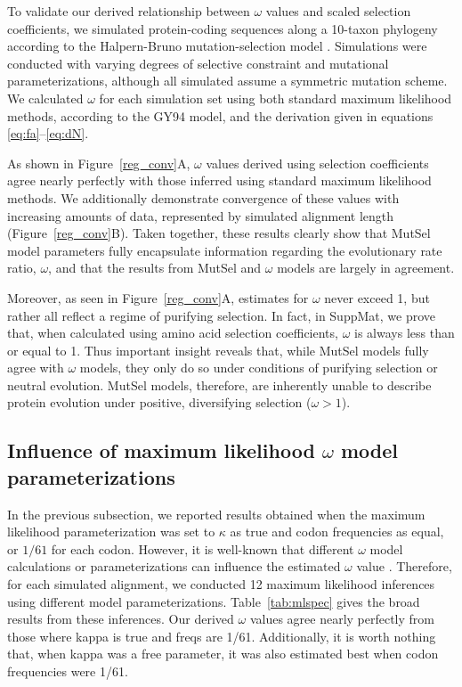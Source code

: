 \documentclass[11pt]{article}
\begin{document}
To validate our derived relationship between $\omega$ values and scaled selection coefficients, we simulated protein-coding sequences along a 10-taxon phylogeny according to the Halpern-Bruno mutation-selection model \cite{HalpernBruno1998}. Simulations were conducted with varying degrees of selective constraint and mutational parameterizations, although all simulated assume a symmetric mutation scheme. We calculated $\omega$ for each simulation set using both standard maximum likelihood methods, according to the GY94 \cite{GoldmanYang1994} model, and the derivation given in equations \eqref{eq:fa}--\eqref{eq:dN}. 

As shown in Figure~\ref{reg_conv}A, $\omega$ values derived using selection coefficients agree nearly perfectly with those inferred using standard maximum likelihood methods. We additionally demonstrate convergence of these values with increasing amounts of data, represented by simulated alignment length (Figure~\ref{reg_conv}B). Taken together, these results clearly show that MutSel model parameters fully encapsulate information regarding the evolutionary rate ratio, $\omega$, and that the results from MutSel and $\omega$ models are largely in agreement. 

Moreover, as seen in Figure~\ref{reg_conv}A, estimates for $\omega$ never exceed 1, but rather all reflect a regime of purifying selection. In fact, in SuppMat, we prove that, when calculated using amino acid selection coefficients, $\omega$ is always less than or equal to 1. Thus important insight reveals that, while MutSel models fully agree with $\omega$ models, they only do so under conditions of purifying selection or neutral evolution. MutSel models, therefore, are inherently unable to describe protein evolution under positive, diversifying selection ($\omega > 1$).



\subsection*{Influence of maximum likelihood $\omega$ model parameterizations}

In the previous subsection, we reported results obtained when the maximum likelihood parameterization was set to $\kappa$ as true and codon frequencies as equal, or $1/61$ for each codon. However, it is well-known that different $\omega$ model calculations or parameterizations can influence the estimated $\omega$ value \cite{YN00,Yang2006,ZhangYu2006}. Therefore, for each simulated alignment, we conducted 12 maximum likelihood inferences using different model parameterizations. Table~\ref{tab:mlspec} gives the broad results from these inferences. Our derived $\omega$ values agree nearly perfectly from those where kappa is true and freqs are 1/61. Additionally, it is worth nothing that, when kappa was a free parameter, it was also estimated best when codon frequencies were 1/61.
\end{document}
